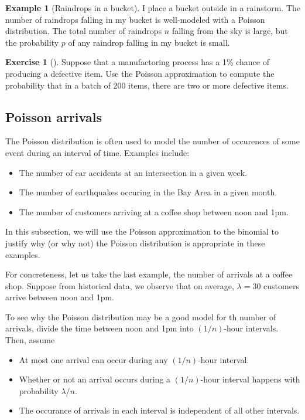 \documentclass[11pt]{article}
\theoremstyle{definition}
\newtheorem{example}[theorem]{Example}
\newtheorem{exercise}[]{Exercise}
\begin{document}
\begin{example}[Raindrops in a bucket]
  I place a bucket outside in a rainstorm.
  The number of raindrops falling in my bucket
  is well-modeled with a Poisson distribution.
  The total number of raindrops $n$ falling from the sky
  is large, but the probability $p$ of any raindrop falling in my bucket is small.
\end{example}

\begin{exercise}[]
Suppose that a manufactoring process has a
1\% chance of producing a defective item.
Use the Poisson approximation to compute the probability
that in a batch of 200 items, there are two or more
defective items.
\end{exercise}

\subsection{Poisson arrivals}

The Poisson distribution is often used to model the number
of occurences of some event during an interval of time.
Examples include:
\begin{itemize}
  \item The number of car accidents at an
   intersection in a given week.
  \item The number of earthquakes occuring in the Bay Area in a given month.
  \item The number of customers arriving at a coffee shop between noon and 1pm.
\end{itemize}

In this subsection, we will use the Poisson approximation
to the binomial to justify why (or why not) the
Poisson distribution is appropriate in these examples.

For concreteness, let us take the last example, the number
of arrivals at a coffee shop.
Suppose from historical data, we observe that on average,
$\lambda = 30$ customers arrive between noon and 1pm.

To see why the Poisson distribution may be a good model
for th number of arrivals,
divide the time between noon and 1pm into $(1/n)$-hour
intervals. Then, assume
\begin{itemize}
  \item At most one arrival can occur during any
  $(1/n)$-hour interval.
  \item Whether or not an arrival occurs during a
  $(1/n)$-hour interval happens with probability $\lambda / n$.
  \item The occurance of arrivals in each interval is independent of all other intervals.
\end{itemize}
\end{document}

